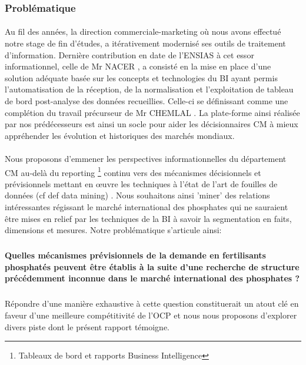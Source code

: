 	\subsubsection{Problématique}\label{problematik}
	
	\paragraph{}
Au fil des années, la direction commerciale-marketing où nous avons effectué notre stage de fin d'études, a itérativement modernisé ses outils de traitement d'information. Dernière contribution en date de l'ENSIAS à cet essor informationnel, celle de Mr NACER \cite{NACER}, a consisté en la mise en place d'une solution adéquate basée sur les concepts et technologies du BI ayant permis l'automatisation de la réception, de la normalisation et l'exploitation de tableau de bord post-analyse des données recueillies. Celle-ci se définissant comme une complétion du travail précurseur de Mr CHEMLAL \cite{CHEMLAL}.  La plate-forme ainsi réalisée par nos prédécesseurs est ainsi un socle pour aider les décisionnaires CM à mieux appréhender les évolution et historiques des marchés mondiaux.
\paragraph{}Nous proposons d'emmener les perspectives informationnelles du département CM au-delà du reporting \footnote{Tableaux de bord et rapports Business Intelligence} continu vers des mécanismes décisionnels et prévisionnels mettant en œuvre les techniques à l'état de l'art de fouilles de données (cf def data mining) . Nous souhaitons ainsi 'miner' des relations intéressantes régissant le marché international des phosphates qui ne sauraient être mises en relief par les techniques de la BI à savoir la segmentation en faits, dimensions et mesures. Notre problématique s'articule ainsi:\subparagraph*{}\textbf{Quelles mécanismes prévisionnels de la demande en fertilisants phosphatés peuvent être établis à la suite d'une recherche de structure précédemment inconnue dans le marché international des phosphates ?}\subparagraph*{}Répondre d'une manière exhaustive à cette question constituerait un atout clé en faveur d'une meilleure compétitivité de l'OCP et nous nous proposons d'explorer divers piste dont le présent rapport témoigne. 
